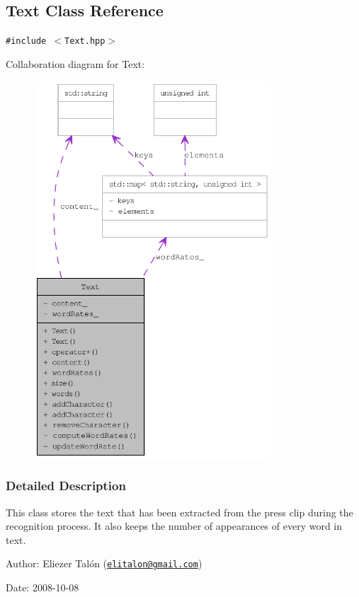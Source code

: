 \hypertarget{class_text}{
\subsection{Text Class Reference}
\label{class_text}
}
{\tt \#include $<$Text.hpp$>$}

Collaboration diagram for Text:\nopagebreak
\begin{figure}[H]
\begin{center}
\leavevmode
\includegraphics[height=400pt]{class_text__coll__graph}
\end{center}
\end{figure}


\subsubsection{Detailed Description}
This class stores the text that has been extracted from the press clip during the recognition process. It also keeps the number of appearances of every word in text.

\begin{Desc}
\item[Author:]Eliezer Talón (\href{mailto:elitalon@gmail.com}{\tt elitalon@gmail.com}) \end{Desc}
\begin{Desc}
\item[Date:]2008-10-08 \end{Desc}
